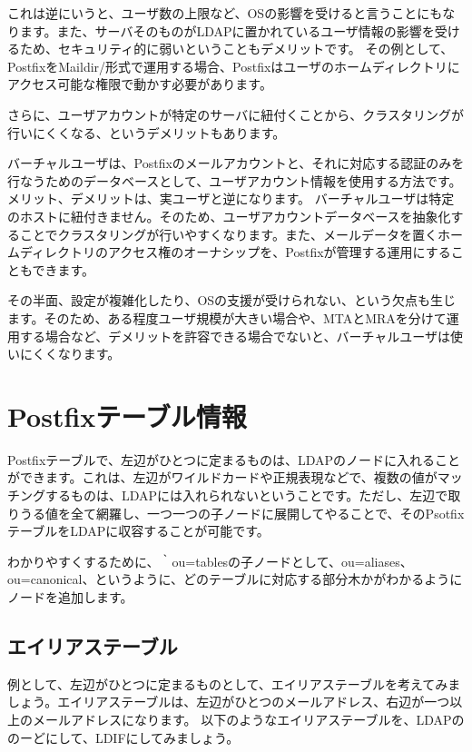 これは逆にいうと、ユーザ数の上限など、OSの影響を受けると言うことにもなります。また、サーバそのものがLDAPに置かれているユーザ情報の影響を受けるため、セキュリティ的に弱いということもデメリットです。
その例として、PostfixをMaildir/形式で運用する場合、Postfixはユーザのホームディレクトリにアクセス可能な権限で動かす必要があります。

さらに、ユーザアカウントが特定のサーバに紐付くことから、クラスタリングが行いにくくなる、というデメリットもあります。


バーチャルユーザは、Postfixのメールアカウントと、それに対応する認証のみを行なうためのデータベースとして、ユーザアカウント情報を使用する方法です。メリット、デメリットは、実ユーザと逆になります。
バーチャルユーザは特定のホストに紐付きません。そのため、ユーザアカウントデータベースを抽象化することでクラスタリングが行いやすくなります。また、メールデータを置くホームディレクトリのアクセス権のオーナシップを、Postfixが管理する運用にすることもできます。

その半面、設定が複雑化したり、OSの支援が受けられない、という欠点も生じます。そのため、ある程度ユーザ規模が大きい場合や、MTAとMRAを分けて運用する場合など、デメリットを許容できる場合でないと、バーチャルユーザは使いにくくなります。


\section{Postfixテーブル情報}

Postfixテーブルで、左辺がひとつに定まるものは、LDAPのノードに入れることができます。これは、左辺がワイルドカードや正規表現などで、複数の値がマッチングするものは、LDAPには入れられないということです。ただし、左辺で取りうる値を全て網羅し、一つ一つの子ノードに展開してやることで、そのPsotfixテーブルをLDAPに収容することが可能です。

わかりやすくするために、｀ou=tablesの子ノードとして、ou=aliases、ou=canonical、というように、どのテーブルに対応する部分木かがわかるようにノードを追加します。


\subsection{エイリアステーブル}

例として、左辺がひとつに定まるものとして、エイリアステーブルを考えてみましょう。エイリアステーブルは、左辺がひとつのメールアドレス、右辺が一つ以上のメールアドレスになります。
以下のようなエイリアステーブルを、LDAPののーどにして、LDIFにしてみましょう。

